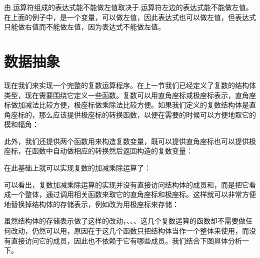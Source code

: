 由.运算符组成的表达式能不能做左值取决于.运算符左边的表达式能不能做左值。在上面的例子中，是一个变量，可以做左值，因此表达式也可以做左值，但表达式只能做右值而不能做左值，因为表达式不能做左值。




\section{数据抽象}
%
现在我们来实现一个完整的复数运算程序。在上一节我们已经定义了复数的结构体类型，现在需要围绕它定义一些函数。复数可以用直角座标或极座标表示，直角座标做加减法比较方便，极座标做乘除法比较方便。如果我们定义的复数结构体是直角座标的，那么应该提供极座标的转换函数，以便在需要的时候可以方便地取它的模和辐角：




此外，我们还提供两个函数用来构造复数变量，既可以提供直角座标也可以提供极座标，在函数中自动做相应的转换然后返回构造的复数变量：




在此基础上就可以实现复数的加减乘除运算了：




可以看出，复数加减乘除运算的实现并没有直接访问结构体的成员和，而是把它看成一个整体，通过调用相关函数来取它的直角座标和极座标。这样就可以非常方便地替换掉结构体的存储表示，例如改为用极座标来存储：




虽然结构体的存储表示做了这样的改动，、、、这几个复数运算的函数却不需要做任何改动，仍然可以用，原因在于这几个函数只把结构体当作一个整体来使用，而没有直接访问它的成员，因此也不依赖于它有哪些成员。我们结合下图具体分析一下。


